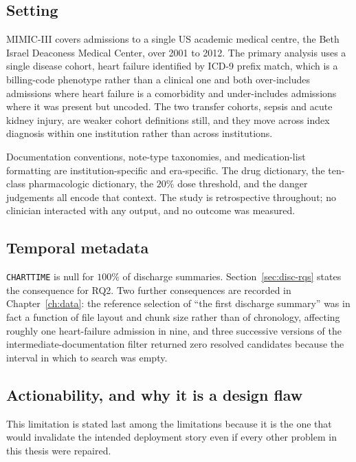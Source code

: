 \subsection{Setting}

MIMIC-III covers admissions to a single US academic medical centre, the Beth
Israel Deaconess Medical Center, over 2001 to 2012. The primary analysis uses a
single disease cohort, heart failure identified by ICD-9 prefix match, which is
a billing-code phenotype rather than a clinical one and both over-includes
admissions where heart failure is a comorbidity and under-includes admissions
where it was present but uncoded. The two transfer cohorts, sepsis and acute
kidney injury, are weaker cohort definitions still, and they move across index
diagnosis within one institution rather than across institutions.

Documentation conventions, note-type taxonomies, and medication-list formatting
are institution-specific and era-specific. The drug dictionary, the ten-class
pharmacologic dictionary, the $20\%$ dose threshold, and the danger judgements
all encode that context. The study is retrospective throughout; no clinician
interacted with any output, and no outcome was measured.

\subsection{Temporal metadata}

\texttt{CHARTTIME} is null for $100\%$ of discharge summaries.
Section~\ref{sec:disc-rqs} states the consequence for RQ2. Two further
consequences are recorded in Chapter~\ref{ch:data}: the reference selection of
``the first discharge summary'' was in fact a function of file layout and chunk
size rather than of chronology, affecting roughly one heart-failure admission in
nine, and three successive versions of the intermediate-documentation filter
returned zero resolved candidates because the interval in which to search was
empty.

\subsection{Actionability, and why it is a design flaw}
\label{sec:disc-actionability}

This limitation is stated last among the limitations because it is the one that
would invalidate the intended deployment story even if every other problem in
this thesis were repaired.

